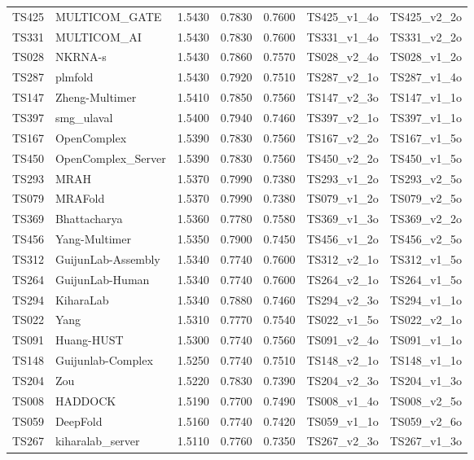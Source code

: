 \begin{table}[ht]
{\begin{tabular}{llrrrll}
TS425 & MULTICOM\_GATE & 1.5430 & 0.7830 & 0.7600 & TS425\_v1\_4o & TS425\_v2\_2o \\ 
TS331 & MULTICOM\_AI & 1.5430 & 0.7830 & 0.7600 & TS331\_v1\_4o & TS331\_v2\_2o \\ 
TS028 & NKRNA-s & 1.5430 & 0.7860 & 0.7570 & TS028\_v2\_4o & TS028\_v1\_2o \\ 
TS287 & plmfold & 1.5430 & 0.7920 & 0.7510 & TS287\_v2\_1o & TS287\_v1\_4o \\ 
TS147 & Zheng-Multimer & 1.5410 & 0.7850 & 0.7560 & TS147\_v2\_3o & TS147\_v1\_1o \\ 
TS397 & smg\_ulaval & 1.5400 & 0.7940 & 0.7460 & TS397\_v2\_1o & TS397\_v1\_1o \\ 
TS167 & OpenComplex & 1.5390 & 0.7830 & 0.7560 & TS167\_v2\_2o & TS167\_v1\_5o \\ 
TS450 & OpenComplex\_Server & 1.5390 & 0.7830 & 0.7560 & TS450\_v2\_2o & TS450\_v1\_5o \\ 
TS293 & MRAH & 1.5370 & 0.7990 & 0.7380 & TS293\_v1\_2o & TS293\_v2\_5o \\ 
TS079 & MRAFold & 1.5370 & 0.7990 & 0.7380 & TS079\_v1\_2o & TS079\_v2\_5o \\ 
TS369 & Bhattacharya & 1.5360 & 0.7780 & 0.7580 & TS369\_v1\_3o & TS369\_v2\_2o \\ 
TS456 & Yang-Multimer & 1.5350 & 0.7900 & 0.7450 & TS456\_v1\_2o & TS456\_v2\_5o \\ 
TS312 & GuijunLab-Assembly & 1.5340 & 0.7740 & 0.7600 & TS312\_v2\_1o & TS312\_v1\_5o \\ 
TS264 & GuijunLab-Human & 1.5340 & 0.7740 & 0.7600 & TS264\_v2\_1o & TS264\_v1\_5o \\ 
TS294 & KiharaLab & 1.5340 & 0.7880 & 0.7460 & TS294\_v2\_3o & TS294\_v1\_1o \\ 
TS022 & Yang & 1.5310 & 0.7770 & 0.7540 & TS022\_v1\_5o & TS022\_v2\_1o \\ 
TS091 & Huang-HUST & 1.5300 & 0.7740 & 0.7560 & TS091\_v2\_4o & TS091\_v1\_1o \\ 
TS148 & Guijunlab-Complex & 1.5250 & 0.7740 & 0.7510 & TS148\_v2\_1o & TS148\_v1\_1o \\ 
TS204 & Zou & 1.5220 & 0.7830 & 0.7390 & TS204\_v2\_3o & TS204\_v1\_3o \\ 
TS008 & HADDOCK & 1.5190 & 0.7700 & 0.7490 & TS008\_v1\_4o & TS008\_v2\_5o \\ 
TS059 & DeepFold & 1.5160 & 0.7740 & 0.7420 & TS059\_v1\_1o & TS059\_v2\_6o \\ 
TS267 & kiharalab\_server & 1.5110 & 0.7760 & 0.7350 & TS267\_v2\_3o & TS267\_v1\_3o \\ 

\end{tabular}}
\end{table}

